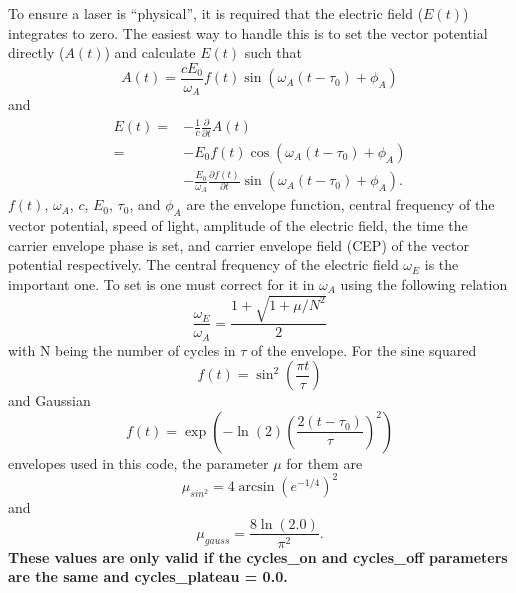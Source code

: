 \documentclass{article}
\begin{document}
To ensure a laser is ``physical'', it is required that the electric field ($E(t)$) integrates to zero. The easiest way to handle this is to set the vector potential directly ($A(t)$) and calculate $E(t)$ such that
\begin{equation}
A(t) = \frac{cE_0}{\omega_A} f(t) \sin(\omega_A(t-\tau_0)+\phi_A)
\label{eq:afield}
\end{equation}
and
\begin{equation}
\begin{split}
\label{eq:efield}
E(t) =& -\frac{1}{c}\frac{\partial}{\partial t}A(t)
\\
=&-E_0f(t) \cos(\omega_A (t-\tau_0) +\phi_A)
\\
&
-\frac{E_0}{\omega_A}\frac{\partial f(t)}{\partial t}
\sin(\omega_A (t-\tau_0) +\phi_A).
\end{split}
\end{equation}
$f(t)$, $\omega_A$,
$c$, $E_0$, $\tau_0$, and $\phi_A$ are the envelope function, central frequency of the vector potential, speed of light, amplitude of the electric field, the time the carrier envelope phase is set, and carrier envelope field (CEP) of the vector potential respectively. The central frequency of the electric field $\omega_E$ is the important one. To set is one must correct for it in $\omega_A$ using the following relation
\begin{equation}
\label{eq:fshift}
\frac{\omega_E}{\omega_A} = \frac{1+\sqrt{1+\mu/N^{2}}}{2}
\end{equation}
with N being the number of cycles in $\tau$ of the envelope. For the sine squared
\begin{equation}
f(t) = \sin^2\left(\frac{\pi t}{\tau}\right)
\label{eq:sin2}
\end{equation}
and Gaussian
\begin{equation}
f(t) = \exp\left(-\ln(2)\left(\frac{2(t-\tau_0)}{\tau}\right)^2\right)
\label{eq:gauss}
\end{equation}
envelopes used in this code, the parameter $\mu$ for them are
\begin{equation}
  \mu_{sin^2} = 4  \arcsin(e^{-1 / 4})^2
\end{equation}
and
\begin{equation}
  \mu_{gauss} = \frac{8 \ln(2.0) }{ \pi^2}.
\end{equation}
\textbf{These values are only valid if the cycles\_on and cycles\_off parameters are the same and cycles\_plateau = 0.0.}
\end{document}
